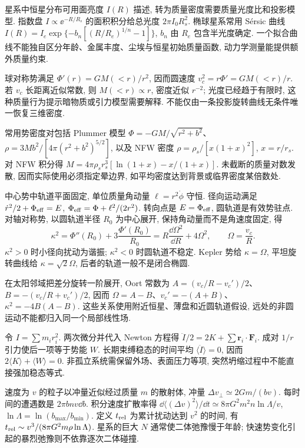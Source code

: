 \label{ch:galaxy}
星系中恒星分布可用面亮度 $I(R)$ 描述, 转为质量密度需要质量光度比和投影模型. 指数盘 $I\propto\ee^{-R/R_s}$ 的面积积分给总光度 $2\pi I_0R_s^2$. 椭球星系常用 Sérsic 曲线 $I(R)=I_e\exp\{-b_n[(R/R_e)^{1/n}-1]\}$, $b_n$ 由 $R_e$ 包含半光度确定. 一个拟合曲线不能独自区分年龄、金属丰度、尘埃与恒星初始质量函数, 动力学测量能提供额外质量约束.

球对称势满足 $\Phi'(r)=GM(<r)/r^2$, 因而圆速度 $v_c^2=r\Phi'=GM(<r)/r$. 若 $v_c$ 长距离近似常数, 则 $M(<r)\propto r$, 密度近似 $r^{-2}$; 光度已经趋于有限时, 这种质量行为提示暗物质或引力模型需要解释. 不能仅由一条投影旋转曲线无条件唯一恢复三维密度.

常用势密度对包括 Plummer 模型
$\Phi=-GM/\sqrt{r^2+b^2}$、$\rho=3Mb^2/[4\pi(r^2+b^2)^{5/2}]$,
以及 NFW 密度 $\rho=\rho_s/[x(1+x)^2]$, $x=r/r_s$. 对 NFW 积分得 $M=4\pi\rho_sr_s^3[\ln(1+x)-x/(1+x)]$. 未截断的质量对数发散, 因而实际使用必须指定晕边界, 如平均密度达到背景或临界密度某倍数处.

中心势中轨道平面固定, 单位质量角动量 $\ell=r^2\dot\phi$ 守恒. 径向运动满足 $\dot r^2/2+\Phi_{\rm eff}=E$, $\Phi_{\rm eff}=\Phi+\ell^2/(2r^2)$. 转向点是 $E=\Phi_{\rm eff}$, 圆轨道是有效势驻点. 对轴对称势, 以圆轨道半径 $R_0$ 为中心展开, 保持角动量而不是角速度固定, 得
\begin{equation}\label{eq:epicycle}
\kappa^2=\Phi''(R_0)+3\frac{\Phi'(R_0)}{R_0}
=R\frac{\dd\Omega^2}{\dd R}+4\Omega^2,
\qquad\Omega=\frac{v_c}R.
\end{equation}
$\kappa^2>0$ 时小径向扰动为谐振; $\kappa^2<0$ 时圆轨道不稳定. Kepler 势给 $\kappa=\Omega$, 平坦旋转曲线给 $\kappa=\sqrt2\Omega$, 后者的轨道一般不是闭合椭圆.

在太阳邻域把差分旋转一阶展开, Oort 常数为 $A=(v_c/R-v_c')/2$、$B=-(v_c/R+v_c')/2$, 因而 $\Omega=A-B$、$v_c'=-(A+B)$、$\kappa^2=-4B(A-B)$. 这些关系使用附近恒星、薄盘和近圆轨道假设, 远处的非圆运动不能都归入同一个局部线性场.

令 $I=\sum m_ir_i^2$. 两次微分并代入 Newton 方程得 $\ddot I/2=2K+\sum\boldsymbol r_i\cdot\boldsymbol F_i$. 成对 $1/r$ 引力使后一项等于势能 $W$. 长期束缚稳态的时间平均 $\langle\ddot I\rangle=0$, 因而 $2\langle K\rangle+\langle W\rangle=0$. 非孤立系统需保留外场、表面压力等项, 突然坍缩过程中不能直接强加稳态等式.

速度为 $v$ 的粒子以冲量近似经过质量 $m$ 的散射体, 冲量 $\Delta v_\perp\simeq2Gm/(bv)$. 每时间的遭遇数是 $2\pi bn v\dd b$. 积分速度扩散率得
$\dd\langle(\Delta v)^2\rangle/\dd t\simeq8\pi G^2m^2n\ln\Lambda/v$,
$\ln\Lambda=\ln(b_{\max}/b_{\min})$.
定义 $t_{\rm rel}$ 为累计扰动达到 $v^2$ 的时间, 有 $t_{\rm rel}\sim v^3/(8\pi G^2m\rho\ln\Lambda)$. 星系的巨大 $N$ 通常使二体弛豫慢于年龄; 快速势变化引起的暴烈弛豫则不依靠逐次二体碰撞.
